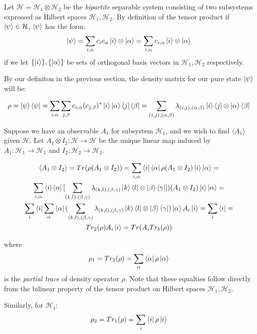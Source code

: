 \documentclass{../quantum.tex}
\begin{document}
Let $\mathcal{H} = \mathcal{H}_1 \otimes \mathcal{H}_2$ be the \textit{bipartite} separable system consisting of two subsystems expressed as Hilbert spaces $\mathcal{H}_1,\mathcal{H}_2$. By definition of the tensor product if $\ket{\psi} \in \mathcal{H}$, $\ket{\psi}$ has the form:
$$ \ket{\psi} = \sum_{i,\alpha} c_{i}c_{\alpha} \ket{i}\otimes\ket{\alpha} =  \sum_{i,\alpha} c_{i,\alpha} \ket{i}\otimes\ket{\alpha}$$
if we let $\{\ket{i}\},\{\ket{\alpha}\}$ be sets of orthogonal basis vectors in $\mathcal{H}_1,\mathcal{H}_2$ respectively.

By our definiton in the previous section, the density matrix for our pure state $\ket{\psi}$ will be:

$$ \rho = \ket{\psi}\bra{\psi} = \sum_{i,\alpha}\sum_{j,\beta} c_{i,\alpha}(c_{j,\beta})^*\ket{i}\ket{\alpha}\bra{j}\bra{\beta} = \sum_{(i,j),(\alpha,\beta)} \lambda_{(i,j),(\alpha,\beta)} \ket{i}\bra{j}\otimes \ket{\alpha}\bra{\beta}$$

Suppose we have an observable $A_1$ for subsystem $\mathcal{H}_1$, and we wish to find $\langle A_1 \rangle$ given $\mathcal{H}$. Let $A_1 \otimes I_2: \mathcal{H} \rightarrow \mathcal{H}$ be the unique linear map induced by $A_1:\mathcal{H}_1 \rightarrow \mathcal{H}_1$ and $I_2: \mathcal{H}_2 \rightarrow \mathcal{H}_2$.

\begin{gather}
  \langle A_1 \otimes I_2 \rangle = Tr(\rho(A_1 \otimes I_2)) = \sum_{i,\alpha} \bra{i}\bra{\alpha}\rho(A_1 \otimes I_2) \ket{i}\ket{\alpha} = \\
  \sum_{i,\alpha} \bra{i}\bra{\alpha}[
  \sum_{(k,l),(\beta,\gamma)} \lambda_{(k,l),(\beta,\gamma)} \ket{k}\bra{l}\otimes \ket{\beta}\bra{\gamma}]
  )(A_1 \otimes I_2)\ket{i}\ket{\alpha} = \\
  \sum_{i} \bra{i} \sum_{\alpha} \bra{\alpha}(\sum_{(k,l),(\beta,\gamma)}
   \lambda_{(k,l),(\beta,\gamma)} \ket{k}\bra{l}\otimes \ket{\beta}\bra{\gamma})\ket{\alpha} A_i \ket{i} = \sum_{i} \bra{i} = \\ Tr_2(\rho)A_i \ket{i} = Tr(A_iTr_b(\rho))
\end{gather}

where $$ \rho_1= Tr_2(\rho) = \sum_{\alpha} \bra{\alpha} \rho \ket{\alpha} $$ is the \textit{partial trace} of density operator $\rho$. Note that these equalties follow directly from the bilinear property of the tensor product on Hilbert spaces $\mathcal{H}_1,\mathcal{H}_2$.

Similarly, for $\mathcal{H}_1$:
$$\rho_2 = Tr_1(\rho) = \sum_{i} \bra{i}\rho\ket{i} $$
\end{document}
